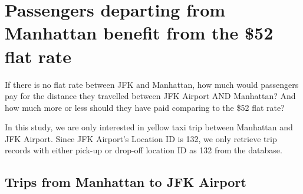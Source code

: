\documentclass[12pt,twoside]{reedthesis}
\newenvironment{Shaded}{\begin{snugshade}}{\end{snugshade}}
\newcommand{\KeywordTok}[1]{\textcolor[rgb]{0.13,0.29,0.53}{\textbf{#1}}}
\newcommand{\DataTypeTok}[1]{\textcolor[rgb]{0.13,0.29,0.53}{#1}}
\newcommand{\DecValTok}[1]{\textcolor[rgb]{0.00,0.00,0.81}{#1}}
\newcommand{\StringTok}[1]{\textcolor[rgb]{0.31,0.60,0.02}{#1}}
\newcommand{\OtherTok}[1]{\textcolor[rgb]{0.56,0.35,0.01}{#1}}
\newcommand{\OperatorTok}[1]{\textcolor[rgb]{0.81,0.36,0.00}{\textbf{#1}}}
\newcommand{\NormalTok}[1]{#1}
\theoremstyle{definition}
\theoremstyle{definition}
\theoremstyle{definition}
\theoremstyle{remark}
\begin{document}
\section{Passengers departing from Manhattan benefit from the \$52 flat
rate}\label{passengers-departing-from-manhattan-benefit-from-the-52-flat-rate}

If there is no flat rate between JFK and Manhattan, how much would
passengers pay for the distance they travelled between JFK Airport AND
Manhattan? And how much more or less should they have paid comparing to
the \$52 flat rate?

In this study, we are only interested in yellow taxi trip between
Manhattan and JFK Airport. Since JFK Airport's Location ID is 132, we
only retrieve trip records with either pick-up or drop-off location ID
as 132 from the database.
\begin{Shaded}
\end{Shaded}
\subsection{Trips from Manhattan to JFK
Airport}\label{trips-from-manhattan-to-jfk-airport}
\end{document}
